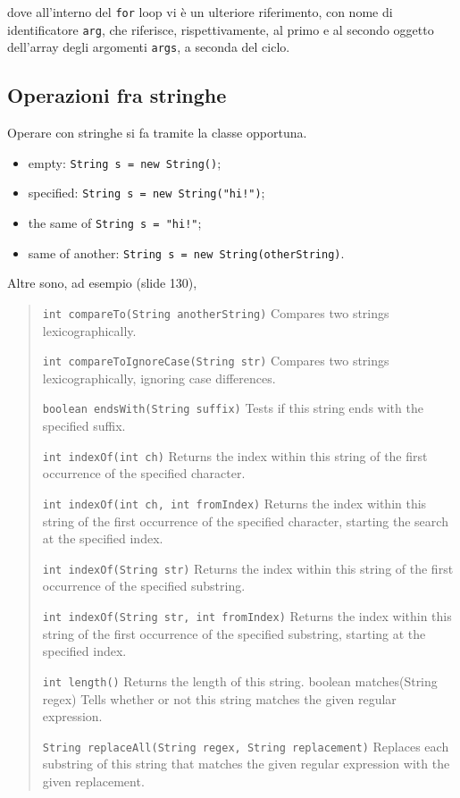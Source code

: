 \documentclass[\fontsizeclass,twocolumn]{\classname}
\theoremstyle{definition}
\theoremstyle{definition}
\begin{document}
dove all'interno del \texttt{for} loop vi è un ulteriore riferimento, con nome di
identificatore \texttt{arg}, che riferisce, rispettivamente, al primo e al
secondo oggetto dell'array degli argomenti \texttt{args}, a seconda del ciclo.

\subsection{Operazioni fra stringhe}

Operare con stringhe si fa tramite la classe opportuna.
\begin{itemize}
    \item empty: \texttt{String s = new String()};
    \item specified: \texttt{String s = new String("hi!")};
    \item the same of \texttt{String s = "hi!"};
    \item same of another: \texttt{String s = new String(otherString)}.
\end{itemize}

Altre sono, ad esempio (slide 130),
\begin{quote}

    \footnotesize{
\texttt{int 	compareTo(String anotherString)} 	Compares two strings
lexicographically. 

\texttt{int 	compareToIgnoreCase(String str)} 	Compares two strings
lexicographically, ignoring case differences. 

\texttt{boolean 	endsWith(String suffix)} 	Tests if this string ends with the
specified suffix. 

\texttt{int indexOf(int ch)} 	Returns the index within this string of the first
occurrence of the specified character. 

\texttt{int 	indexOf(int ch, int fromIndex)} Returns the index within this string of
the first occurrence of the specified character, starting the search at the
specified index. 

\texttt{int 	indexOf(String str)} Returns the index within this string of the first
occurrence of the specified substring. 

\texttt{int 	indexOf(String str, int fromIndex)} 	Returns the index within this
string of the first occurrence of the specified substring, starting at the
specified index. 

\texttt{int 	length()} 	Returns the length of this string. 
boolean matches(String regex) 	Tells whether or not this string matches the
given regular expression. 

\texttt{String 	replaceAll(String regex, String replacement)} Replaces each substring of
this string that matches the given regular expression with the given
replacement.}
\end{quote}
\end{document}
